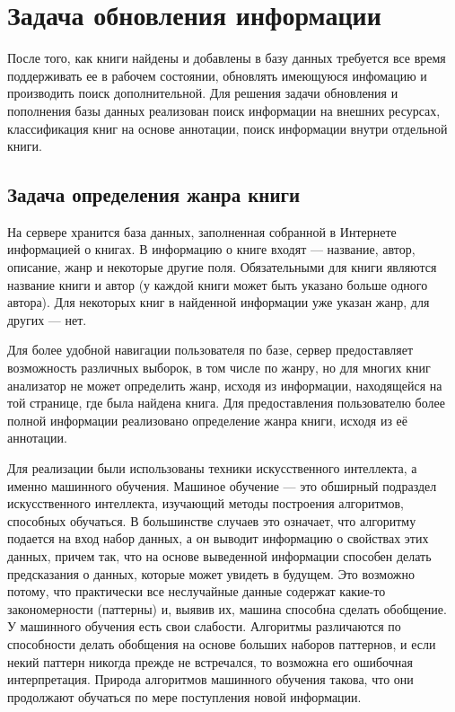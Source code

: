 \section{Задача обновления информации}

После того, как книги найдены и добавлены в базу данных требуется все время поддерживать ее в рабочем состоянии, обновлять имеющуюся инфомацию и производить поиск дополнительной. Для решения задачи обновления и пополнения базы данных реализован поиск информации на внешних ресурсах, классификация книг на основе аннотации, поиск информации внутри отдельной книги.

\subsection{Задача определения жанра книги}

На сервере хранится база данных, заполненная собранной в Интернете информацией о книгах. В информацию о книге входят --- название, автор, описание, жанр и некоторые другие поля. Обязательными для книги являются название книги и автор (у каждой книги может быть указано больше одного автора). Для некоторых книг в найденной информации уже указан жанр, для других --- нет. 

Для более удобной навигации пользователя по базе, сервер предоставляет возможность различных выборок, в том числе по жанру, но для многих книг анализатор не может определить жанр, исходя из информации, находящейся на той странице, где была найдена книга. Для предоставления пользователю более полной информации реализовано определение жанра книги, исходя из её аннотации. 

Для реализации были использованы техники искусственного интеллекта, а именно машинного обучения. Машиное обучение \cite{machine-learning} --- это обширный подраздел искусственного интеллекта, изучающий методы построения алгоритмов, способных обучаться. В большинстве случаев это означает, что алгоритму подается на вход набор данных, а он выводит информацию о свойствах этих данных, причем так, что на основе выведенной информации способен делать предсказания о данных, которые может увидеть в будущем. Это возможно потому, что практически все неслучайные данные содержат какие-то закономерности (паттерны) и, выявив их, машина способна сделать обобщение. У машинного обучения есть свои слабости. Алгоритмы различаются по способности делать обобщения на основе больших наборов паттернов, и если некий паттерн никогда прежде не встречался, то возможна его ошибочная интерпретация. Природа алгоритмов машинного обучения такова, что они продолжают обучаться по мере поступления новой информации.

